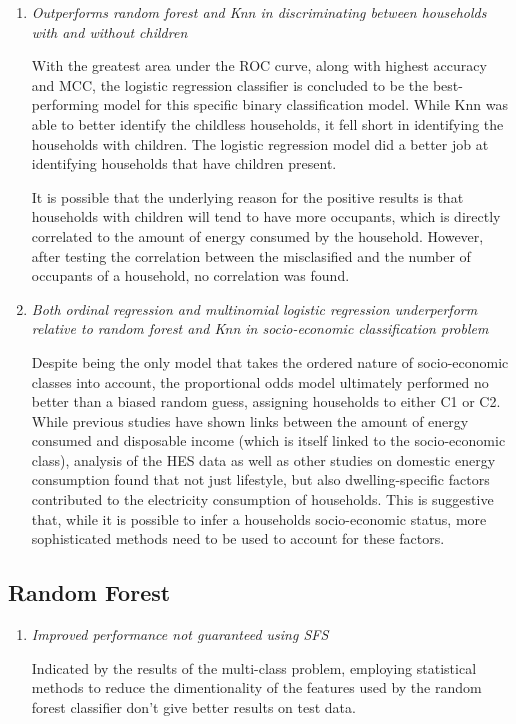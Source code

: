 \begin{enumerate}
\item \textit{Outperforms random forest and Knn in discriminating between households with and without children}

With the greatest area under the ROC curve, along with highest accuracy and MCC, the logistic regression classifier is concluded to be the best-performing model for this specific binary classification model. While Knn was able to better identify the childless households, it fell short in identifying the households with children.  The logistic regression model did a better job at identifying households that have children present. 

It is possible that the underlying reason for the positive results is that households with children will tend to have more occupants, which is directly correlated to the amount of energy consumed by the household. However, after testing the correlation between the misclasified and the number of occupants of a household, no correlation was found.


\item \textit{Both ordinal regression and multinomial logistic regression underperform relative to random forest and Knn in socio-economic classification problem}

Despite being the only model that takes the ordered nature of socio-economic classes into account, the proportional odds model ultimately performed no better than a biased random guess, assigning households to either C1 or C2. While previous studies have shown links between the amount of energy consumed and disposable income (which is itself linked to the socio-economic class), analysis of the HES data as well as other studies on domestic energy consumption found that not just lifestyle, but also dwelling-specific factors contributed to the electricity consumption of households. This is suggestive that, while it is possible to infer a households socio-economic status, more sophisticated methods need to be used to account for these factors.
\end{enumerate}

\subsection{Random Forest}

\begin{enumerate}

\item \textit{Improved performance not guaranteed using SFS}

Indicated by the results of the multi-class problem, employing statistical methods to reduce the dimentionality of the features used by the random forest classifier don't give better results on test data.  

\end{enumerate}

